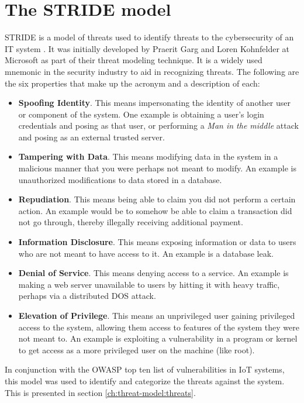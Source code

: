 \section{The STRIDE model} \label{ch:method:stride}
STRIDE is a model of threats used to identify threats to the cybersecurity of an IT system \cite{stride}. It was initially developed by Praerit Garg and Loren Kohnfelder at Microsoft as part of their threat modeling technique. It is a widely used mnemonic in the security industry to aid in recognizing threats. The following are the six properties that make up the acronym and a description of each:
\begin{itemize}
    \item \textbf{Spoofing Identity}. This means impersonating the identity of another user or component of the system. One example is obtaining a user's login credentials and posing as that user, or performing a \textit{Man in the middle} attack and posing as an external trusted server.
    \item \textbf{Tampering with Data}. This means modifying data in the system in a malicious manner that you were perhaps not meant to modify. An example is unauthorized modifications to data stored in a database.
    \item \textbf{Repudiation}. This means being able to claim you did not perform a certain action. An example would be to somehow be able to claim a transaction did not go through, thereby illegally receiving additional payment.
    \item \textbf{Information Disclosure}. This means exposing information or data to users who are not meant to have access to it. An example is a database leak.
    \item \textbf{Denial of Service}. This means denying access to a service. An example is making a web server unavailable to users by hitting it with heavy traffic, perhaps via a distributed \gls{DOS} attack.
    \item \textbf{Elevation of Privilege}. This means an unprivileged user gaining privileged access to the system, allowing them access to features of the system they were not meant to. An example is exploiting a vulnerability in a program or kernel to get access as a more privileged user on the machine (like root).
\end{itemize}
In conjunction with the OWASP top ten list of vulnerabilities in IoT systems, this model was used to identify and categorize the threats against the system. This is presented in section \ref{ch:threat-model:threats}.
